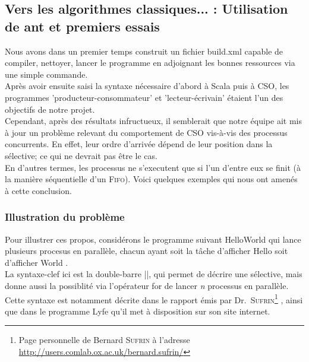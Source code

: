 \documentclass[a4paper,11pt,french]{report}
\begin{document}
\subsection[Vers les algorithmes classiques...]{Vers les algorithmes classiques... : Utilisation de \textsf{ant} et premiers essais}

Nous avons dans un premier temps construit un fichier \textsf{build.xml} capable de compiler, nettoyer, lancer le programme en adjoignant les bonnes ressources via une simple commande.\\ Après avoir ensuite saisi la syntaxe nécessaire d'abord à Scala puis à CSO, les programmes 'producteur-consommateur' et 'lecteur-écrivain' étaient l'un des objectifs de notre projet.\\

Cependant, après des résultats infructueux, il semblerait que notre équipe ait mis à jour un problème relevant du comportement de CSO vis-à-vis des processus concurrents. En effet, leur ordre d'arrivée dépend de leur position dans la sélective; ce qui ne devrait pas être le cas.\\ 

En d'autres termes, les processus ne s'executent que si l'un d'entre eux se finit (à la manière séquentielle d'un \textsc{Fifo}). Voici quelques exemples qui nous ont amenés à cette conclusion.

\subsubsection{Illustration du problème}

Pour illustrer ces propos, considérons le programme suivant \textsf{HelloWorld} qui lance plusieurs procesus en parallèle, chacun ayant soit la tâche d'afficher \og Hello \fg soit d'afficher \og World \fg.\\
La syntaxe-clef ici est la double-barre ||, qui permet de décrire une sélective, mais donne aussi la possiblité via l'opérateur \textsf{for} de lancer \textit{n} processus en parallèle.\\
Cette syntaxe est notamment décrite dans le rapport émis par Dr.\ \textsc{Sufrin}\footnote{Page personnelle de Bernard \textsc{Sufrin} à l'adresse \url{http://users.comlab.ox.ac.uk/bernard.sufrin/}} \cite{cpa2008-cso}, ainsi que dans le programme Lyfe qu'il met à disposition sur son site internet.
\medskip
\end{document}
